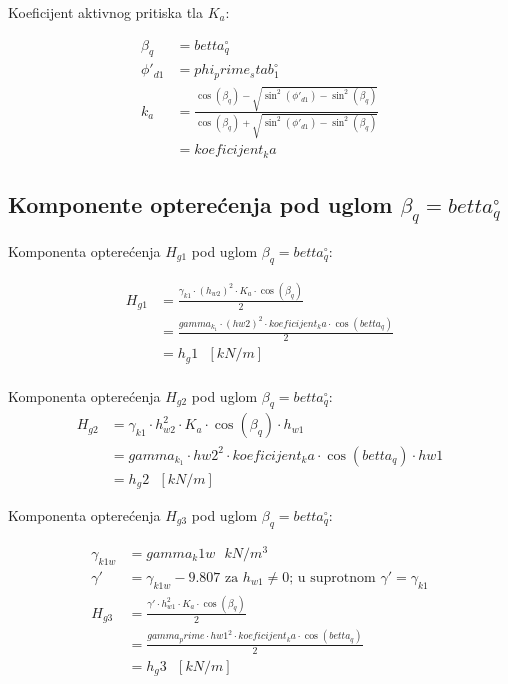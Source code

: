 \documentclass[a4paper, 11pt]{article}
\begin{document}
Koeficijent aktivnog pritiska tla $K_{a}$:

\begin{align*}
\beta_{q} &= betta_q ^\circ \\
\phi'_{d1} &= phi_prime_stab_1 ^\circ  \\
k_a &= \frac{\cos(\beta_q) - \sqrt{\sin^2(\phi'_{d1}) - \sin^2(\beta_q)}}{\cos(\beta_q) + \sqrt{\sin^2(\phi'_{d1}) - \sin^2(\beta_q)}} \\
	&= koeficijent_ka
\end{align*}

\subsection*{Komponente optere\'cenja pod uglom $\beta_{q} = betta_q ^ \circ$}

Komponenta optere\'cenja $H_{g1}$ pod uglom $\beta_{q} = betta_q ^ \circ$:

\begin{align*}
H_{g1} &= \frac{\gamma_{k1} \cdot \left(h_{w2} \right)^2 \cdot K_{a} \cdot \cos(\beta_q)}{2}\\
	   &=  \frac{gamma_k_1 \cdot \left(hw2 \right)^2 \cdot koeficijent_ka \cdot \cos(betta_q)}{2} \\
	   &= h_g1 \text{ } [kN/m] \\
\end{align*}

Komponenta optere\'cenja $H_{g2}$ pod uglom $\beta_{q} = betta_q ^ \circ$:
\begin{align*}
H_{g2} &= \gamma_{k1} \cdot h_{w2}^2 \cdot K_{a} \cdot \cos(\beta_{q}) \cdot h_{w1} \\
	   &= gamma_k_1 \cdot hw2^2 \cdot koeficijent_ka \cdot \cos (betta_q) \cdot hw1 \\
	   &= h_g2 \text{ } [kN/m]
\end{align*}

Komponenta optere\'cenja $H_{g3}$ pod uglom $\beta_{q} = betta_q ^ \circ$:

\begin{align*}
\gamma_{k1w} &= gamma_k1w \text{ } kN/m^3 \\
\gamma' &= \gamma_{k1w} - 9.807 \text{ za } h_{w1} \neq 0 \text{; u suprotnom } \gamma' = \gamma_{k1} \\
H_{g3}  &= \frac{\gamma' \cdot h_{w1} ^2 \cdot K_{a} \cdot \cos( \beta_{q})}{2} \\
		&= \frac{gamma_prime \cdot hw1 ^2 \cdot koeficijent_ka \cdot \cos(betta_q)}{2} \\
		&= h_g3 \text{ } [kN/m]
\end{align*}
\end{document}
